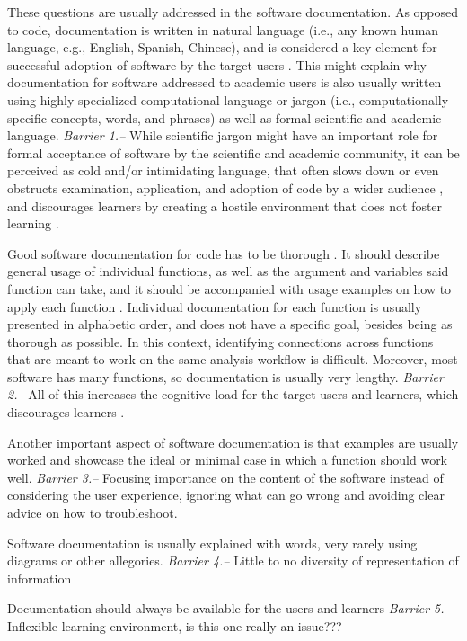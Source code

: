 \documentclass[12pt]{article}
\begin{document}
These questions are usually addressed in the software documentation.
As opposed to code, documentation is written in natural language (i.e.,
any known human language, e.g., English, Spanish, Chinese), and is considered
a key element for successful adoption of software
by the target users \citep{karimzadeh2018top}. This might explain
why documentation for software addressed to academic users is also
usually written using highly specialized computational
language or jargon (i.e., computationally specific concepts,
words, and phrases) as well as formal scientific and academic language.
\textit{Barrier 1.--} While scientific jargon might have an important role for formal acceptance
of software by the scientific and academic community, it can be perceived as
cold and/or intimidating language, that often slows down or even
obstructs examination, application, and adoption of code by a wider audience \citep{ball2017its},
and discourages learners by creating a hostile environment that does not foster learning \citep{CITATION}.

Good software documentation for code has to be thorough \citep{karimzadeh2018top}.
It should describe general usage of individual functions, as well as
the argument and variables said function can take, and it should be accompanied with
usage examples on how to apply each function \citep{karimzadeh2018top}.
Individual documentation for each function is usually presented
in alphabetic order, and does not have a specific goal, besides being as thorough as possible.
In this context, identifying connections across functions that are meant to work on the same
analysis workflow is difficult. Moreover, most software has many functions, so documentation
is usually very lengthy. \textit{Barrier 2.--}  All of this increases the cognitive
load for the target users and learners, which discourages learners \citep{CITATION}.

Another important aspect of software documentation is that examples are usually
worked and showcase the ideal or minimal case in which a function should work well.
\textit{Barrier 3.--} Focusing importance on the content of the software instead
of considering the user experience, ignoring what can go wrong and avoiding clear
advice on how to troubleshoot.

Software documentation is usually explained with words, very rarely using diagrams or
other allegories.
\textit{Barrier 4.--} Little to no diversity of representation of information

Documentation should always be available for the users and learners
\textit{Barrier 5.--} Inflexible learning environment, is this one really an issue???
\end{document}
